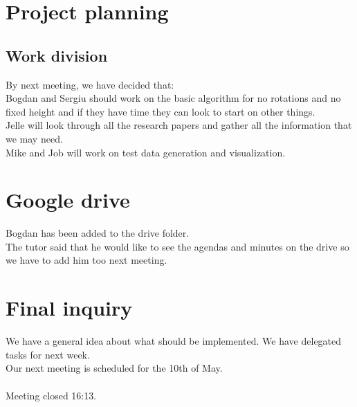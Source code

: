 \documentclass[a4paper,twoside,11pt]{article}
\begin{document}
	\section{Project planning}
	
	\subsection{Work division}
	
	By next meeting, we have decided that: \\
	Bogdan and Sergiu should work on the basic algorithm for no rotations and no fixed height and if they have time they can look to start on other things. \\
	Jelle will look through all the research papers and gather all the information that we may need. \\ 
	Mike and Job will work on test data generation and visualization.
	
	\section{Google drive}
	
	Bogdan has been added to the drive folder. \\
	The tutor said that he would like to see the agendas and minutes on the drive so we have to add him too next meeting.
	
	\section{Final inquiry}
	
	We have a general idea about what should be implemented. We have delegated tasks for next week. \\
	Our next meeting is scheduled for the 10th of May. \\\\
	Meeting closed 16:13.
	
	
\end{document}
